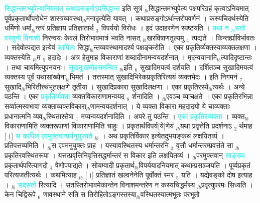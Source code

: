 \documentclass[article,12pt,a4paper]{memoir}%
\newcommand{\quotelemma}[1]{\textcolor{cyan}{#1}}
\begin{document}
	  
	  \pstart \leavevmode%
	\hphantom{.}\quotelemma{सिद्धान्तमभ्युपेत्यानियमात् कथाप्रसङ्गोऽपसिद्धान्त} इति \cite[19b1]{vn-msN} सूत्रं {\tiny $_{lb}$}सिद्धान्तमभ्युपेत्य पक्षपरिग्रहं कृत्वाऽनियमात् पूर्वप्रकृतार्थोपरोधेन शास्त्रव्यवस्था{\tiny $_{lb}$}मनादृत्येति यावत् । कथाप्रसङ्गोऽर्थान्तरोपवर्णनं । कस्यचिदर्थस्येति धर्मिणो धर्मा{\tiny $_{lb}$}न्तरं प्रतिज्ञाय प्रतिज्ञातार्थ {\tiny $_{3}$} विपर्ययो विरोधः । इदं उदाहरणेन स्पष्टयति । \quotelemma{यथा न {\tiny $_{lb}$}सतो वस्तुनो विनाशो} \cite[19b2]{vn-msN} निरन्वयः केवलं तिरोभावमात्रं भवति नासत् {\tiny $_{lb}$}खरविषाणतुल्यमु {\tiny $_{4}$} त्पद्यते । किन्तर्ह्याविर्भावतः । सदेवोत्पद्यत इत्येवं \quotelemma{कापिलः} सिद्धा{\tiny $_{lb}$}न्तव्यवस्थामादर्श्य पक्षङ्करोति । एका प्रकृतिर्व्यक्तस्याव्यक्तलक्षणा । व्यक्तस्येति {\tiny $_{lb}$}म {\tiny $_{5}$} हदादेः । अत्र हेतुमाह विकाराणां शब्दादीनामन्वयदर्शनात् । मृदन्वयानामि{\tiny $_{lb}$}त्यादिदृष्टान्तः । तथा चायमित्युपनयनः। \quotelemma{सुखदुःखमोहसमन्वित} \cite[19b3]{vn-msN} {\tiny $_{lb}$}इति {\tiny $_{6}$} सुखादिमयत्वं दर्शयति । दर्शितञ्च सुखादिमयत्वं व्यक्तस्य पूर्वं यथासांख्येना{\tiny $_{lb}$}भिमतं । तत्तस्मात् सुखादिभिरेकप्रकृतिरित्ययं व्यक्तभेदः । इति निगमनं {\tiny $_{7}$} सुखादि{\tiny $_{lb}$}भिरितीत्त्थंभूतलक्षणे तृतीया । सुखादिप्रकारा सुखादिलक्षणा । एका प्रकृतिरस्ये{\tiny $_{lb}$}त्यर्थः । अन्ये पठन्ति । एका \quotelemma{प्रकृतिर्व्यक्ता} व्यक्तविकाराणामन्वयद {\tiny $_{8}$} \leavevmode{} र्शनादिति । {\tiny $_{lb}$}एवञ्च व्याचक्षते । एका प्रकृतिरभिन्ना सर्व्वात्मस्वभावा व्यक्ताव्यक्तविकारा{\tiny $_{lb}$}णामन्वयदर्शनात् । ये व्यक्ता विकारा महदादयो ये चाव्यक्ताः प्रधानात्मनि व्यव{\tiny $_{lb}$}स्थितास्तेषा {\tiny $_{1}$} मप्यन्वयदर्शनादिति । अपरे तु पठन्ति । \quotelemma{एका प्रकृतिरव्यक्ता} । व्यक्त{\tiny $_{lb}$}विकाराणामिति व्यक्तरूपाणां विकाराणामिति चाहुः । प्रकृतार्थविपर्य[ये]णेयं {\tiny $_{lb}$}यथा प्रवृत्तेति प्रदर्शनाऽ {\tiny $_{2}$} र्थमाह [।] \quotelemma{स कापिल एवमुक्तवान्पर्यनुयुज्यते} {\tiny $_{lb}$} \cite[19b4]{vn-msN} । अथ प्रकृतिर्विकार इत्येतदुभयङ्कथं लक्षयितव्यं । प्रतिपत्तव्यमिति । {\tiny $_{lb}$}स एवमनुयुक्तः प्राह । यस्यावस्थितस्य धर्मान्तरनि {\tiny $_{3}$} वृत्तौ धर्मान्तरम्प्रवर्त्तते सा {\tiny $_{lb}$}प्रकृतिरवस्थितरूपा । यत्तत्प्रवृत्तिनिवृत्तिसद्धर्मान्तरं स विकार इति लक्षयितव्यं । {\tiny $_{lb}$}परमुक्तवान् \quotelemma{साङ्ख्यः} प्रकृतार्थपरित्यागदो {\tiny $_{4}$} षेणोपपाद्यते । सोयम्वादी प्रकृतार्थ{\tiny $_{lb}$}विपर्ययादनियमात् कथाम्प्रसञ्जयति । पूर्व्वप्रकृतं परित्यजतीत्यर्थः । कथमित्याह {\tiny $_{lb}$} \leavevmode{} [।] प्रतिज्ञातं खल्वनेनेति \cite[19b5]{vn-msN} पूर्वोक्तं स्मर {\tiny $_{5}$} यति । यद्येवङ्को दोष इत्याह । {\tiny $_{lb}$} \quotelemma{सदसतो} रित्यादि । सतस्तिरोभावमेकान्तेन विनाशमन्तरेण न कस्यचिद्धर्मस्य {\tiny $_{lb}$}प्रवृत्युपरमः सिध्यति । केन चिद्विरूपे {\tiny $_{6}$} णावस्थाने सति स तिरोहितोऽङ्गस्तस्या{\tiny $_{lb}$}वस्थितस्यात्मभूतः परभूतो 
\end{document}
